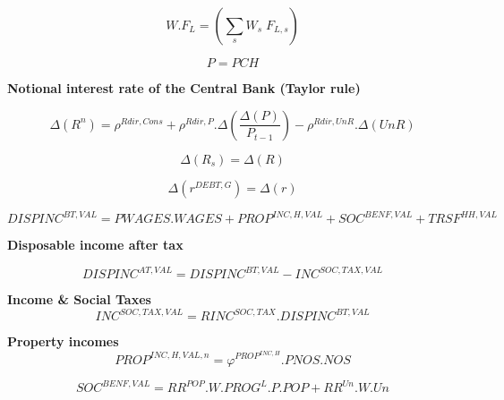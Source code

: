 \documentclass[12pt]{article}
\numberwithin{equation}{section}
\begin{document}
\begin{dmath}
W . F_{L} = \left( \sum_{s} W_{s} \; F_{L, s} \right)
\end{dmath}


\begin{dmath}
P = PCH
\end{dmath}

\textbf{Notional interest rate of the Central Bank (Taylor rule)}

\begin{dmath}
\varDelta \left(R^{n}\right) = \rho^{Rdir,Cons} + \rho^{Rdir,P} . \varDelta \left(\frac{\varDelta \left(P\right)}{P_{t-1}}\right) - \rho^{Rdir,UnR} . \varDelta \left(UnR\right)
\end{dmath}



\begin{dmath}
\varDelta \left(R_{s}\right) = \varDelta \left(R\right)
\end{dmath}



\begin{dmath}
\varDelta \left(r^{DEBT,G}\right) = \varDelta \left(r\right)
\end{dmath}







\begin{dmath}
DISPINC^{BT,VAL} = PWAGES . WAGES + PROP^{INC,H,VAL} + SOC^{BENF,VAL} + TRSF^{HH,VAL}
\end{dmath}

\textbf{Disposable income after tax}


\begin{dmath}
DISPINC^{AT,VAL} = DISPINC^{BT,VAL} - INC^{SOC,TAX,VAL}
\end{dmath}



\textbf{Income \& Social Taxes}
\begin{dmath}
INC^{SOC,TAX,VAL} = RINC^{SOC,TAX} . DISPINC^{BT,VAL}
\end{dmath}

\textbf{Property incomes}
\begin{dmath}
PROP^{INC,H,VAL,n} = \varphi^{PROP^{INC,H}} . PNOS . NOS
\end{dmath}



\begin{dmath}
SOC^{BENF,VAL} = RR^{POP} . W . PROG^{L} . P . POP + RR^{Un} . W . Un
\end{dmath}
\end{document}
